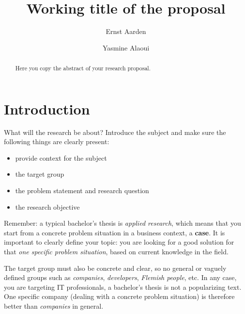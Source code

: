 \documentclass[english]{hogent-article}
\title{Working title of the proposal}
\author{Ernst Aarden}
\author{Yasmine Alaoui}
\begin{document}
\begin{abstract}
  Here you copy the abstract of your research proposal.
\end{abstract}

\tableofcontents

\bigskip





\section{Introduction}%
\label{sec:Introduction}

What will the research be about? Introduce the subject and make sure the following things are clearly present:

\begin{itemize}
  \item provide context for the subject
  \item the target group
  \item the problem statement and research question
  \item the research objective
\end{itemize}

Remember: a typical bachelor's thesis is \textit{applied research}, which means that you start from a concrete problem situation in a business context, a \textbf{case}. It is important to clearly define your topic: you are looking for a good solution for that \textit{one specific problem situation}, based on current knowledge in the field.

The target group must also be concrete and clear, so no general or vaguely defined groups such as \emph{companies}, \emph{developers}, \emph{Flemish people}, etc. In any case, you are targeting IT professionals, a bachelor's thesis is not a popularizing text. One specific company (dealing with a concrete problem situation) is therefore better than \emph{companies} in general.
\end{document}

